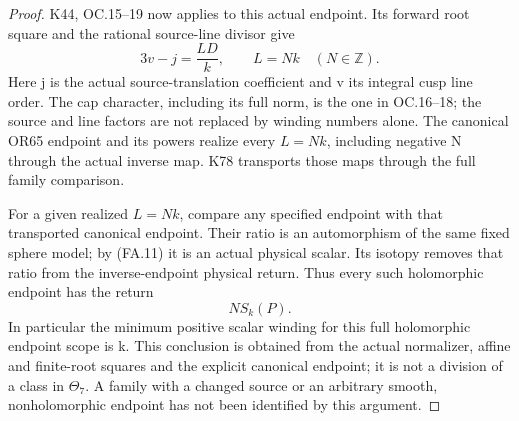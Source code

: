 \begin{proof}
K44, OC.15--19 now applies to this actual endpoint. Its forward root
square and the rational source-line divisor give
\[
                  3v-j=\frac{L D}{k},\qquad
                         L=N k\quad(N\in\mathbb Z).      \tag{FA.14}
\]
Here j is the actual source-translation coefficient and v its integral
cusp line order. The cap character, including its full norm, is the one
in OC.16--18; the source and line factors are not replaced by winding
numbers alone. The canonical OR65 endpoint and its powers realize every
\(L=Nk\), including negative N through the actual inverse map. K78 transports
those maps through the full family comparison.

For a given realized \(L=Nk\), compare any specified endpoint with that
transported canonical endpoint. Their ratio is an automorphism of the
same fixed sphere model; by (FA.11) it is an actual physical scalar.
Its isotopy removes that ratio from the inverse-endpoint physical
return. Thus every such holomorphic endpoint has the return
\[
                                N S_k(P).                \tag{FA.15}
\]
In particular the minimum positive scalar winding for this full
holomorphic endpoint scope is k. This conclusion is obtained from the
actual normalizer, affine and finite-root squares and the explicit
canonical endpoint; it is not a division of a class in \(\Theta_7\). A family
with a changed source or an arbitrary smooth, nonholomorphic endpoint
has not been identified by this argument.

\end{proof}
